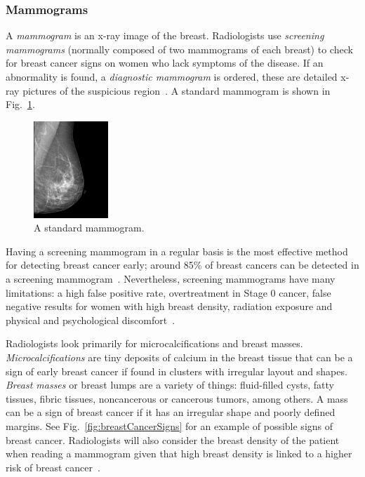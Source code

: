 \subsubsection{Mammograms}
A \emph{mammogram} is an x-ray image of the breast. Radiologists use \emph{screening mammograms} (normally composed of two mammograms of each breast) to check for breast cancer signs on women who lack symptoms of the disease. If an abnormality is found, a \emph{diagnostic mammogram} is ordered, these are detailed x-ray pictures of the suspicious region~\cite{Mammograms2014}. A standard mammogram is shown in Fig.~\ref{fig:normalMammogram}.

\begin{figure}[h]
	\centering
	\includegraphics[width = 0.25\textwidth]{plots/normalMammogram.jpg}
	\caption[Digital Mammogram]{A standard mammogram.}
	\label{fig:normalMammogram}
\end{figure}

Having a screening mammogram in a regular basis is the most effective method for detecting breast cancer early; around 85\% of breast cancers can be detected in a screening mammogram~\cite{PerformanceMammography2013}. Nevertheless, screening mammograms have many limitations: a high false positive rate, overtreatment in Stage 0 cancer, false negative results for women with high breast density, radiation exposure and physical and psychological discomfort~\cite{Mammograms2014}.

Radiologists look primarily for microcalcifications and breast masses. \emph{Microcalcifications} are tiny deposits of calcium in the breast tissue that can be a sign of early breast cancer if found in clusters with irregular layout and shapes. \emph{Breast masses} or breast lumps are a variety of things: fluid-filled cysts, fatty tissues, fibric tissues, noncancerous or cancerous tumors, among others. A mass can be a sign of breast cancer if it has an irregular shape and poorly defined margins. See Fig.~\ref{fig:breastCancerSigns} for an example of possible signs of breast cancer. Radiologists will also consider the breast density of the patient when reading a mammogram given that high breast density is linked to a higher risk of breast cancer~\cite{MammogramsACS2014}.

